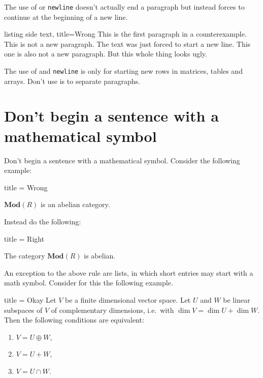 \documentclass[a4paper, 10pt, headings=standardclasses, oneside, bibliography=totocnumbered]{scrbook}
\begin{document}
The use of \texttt{\tbs\tbs} or \texttt{{\tbs}newline} doesn’t actually end a paragraph but instead forces  to continue at the beginning of a new line.
\begin{tcblisting}{listing side text, title={Wrong}}
This is the first paragraph in a counterexample.\\
This is not a new paragraph.
The text was just forced to start a new line.\newline
This one is also not a new paragraph.
But this whole thing looks ugly.
\end{tcblisting}
The use of \texttt{\tbs\tbs} and \texttt{{\tbs}newline} is only for starting new rows in matrices, tables and arrays.
Don’t use is to separate paragraphs.





\section{Don’t begin a sentence with a mathematical symbol}

Don’t begin a sentence with a mathematical symbol.
Consider the following example:
\begin{tcblisting}{title = {Wrong}}
\begin{theorem}
  $\mathbf{Mod}(R)$ is an abelian category.
\end{theorem}
\end{tcblisting}
Instead do the following:
\begin{tcblisting}{title = {Right}}
\begin{theorem}
  The category $\mathbf{Mod}(R)$ is abelian.
\end{theorem}
\end{tcblisting}

An exception to the above rule are lists, in which short entries may start with a math symbol.
Consider for this the following example.
\begin{tcblisting}{title = {Okay}}
Let $V$ be a finite dimensional vector space.
Let $U$ and $W$ be linear subspaces of $V$ of complementary dimensions, i.e.\ with $\dim V = \dim U + \dim W$.
Then the following conditions are equivalent:
\begin{enumerate}[label = \roman*)]
  \item
    $V = U \oplus W$,
  \item
    $V = U + W$,
  \item
    $V = U \cap W$.
\end{enumerate}
\end{tcblisting}
\end{document}
